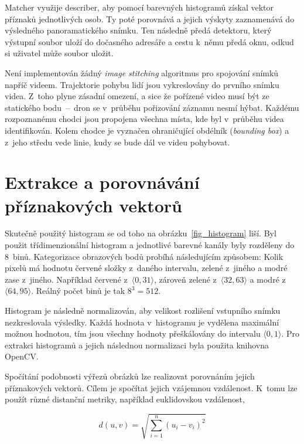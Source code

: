 Matcher využije describer, aby pomocí barevných histogramů získal vektor příznaků jednotlivých osob. Ty poté porovnává a jejich výskyty zaznamenává do výsledného panoramatického snímku. Ten následně předá detektoru, který výstupní soubor uloží do dočasného adresáře a cestu k~němu předá oknu, odkud si uživatel může soubor uložit.

Není implementován žádný \textit{image stitching} algoritmus pro spojování snímků napříč videem. Trajektorie pohybu lidí jsou vykreslovány do prvního snímku videa. Z~toho plyne zásadní omezení, a sice že pořízené video musí být ze statického bodu~--~dron se v~průběhu pořizování záznamu nesmí hýbat. Každému rozpoznanému chodci jsou propojena všechna místa, kde byl v~průběhu videa identifikován. Kolem chodce je vyznačen ohraničující obdélník (\textit{bounding box}) a z~jeho středu vede linie, kudy se bude dál ve videu pohybovat.


\section{Extrakce a porovnávání příznakových vektorů}

Skutečně použitý histogram se od toho na obrázku~\ref{fig_histogram} liší. Byl použit třídimenzionální histogram a jednotlivé barevné kanály byly rozděleny do 8~binů. Kategorizace obrazových bodů probíhá následujícím způsobem: Kolik pixelů má hodnotu červené složky z~daného intervalu, zelené z~jiného a modré zase z~jiného. Například červené z~$\big \langle 0, 31 \big \rangle$, zároveň zelené z~$\big \langle 32, 63 \big \rangle$ a modré z~$\big \langle 64, 95 \big \rangle$. Reálný počet binů je tak $8^3 = 512$.

Histogram je následně normalizován, aby velikost rozlišení vstupního snímku nezkreslovala výsledky. Každá hodnota v~histogramu je vydělena maximální možnou hodnotou, tím jsou všechny hodnoty přeškálovány do intervalu $\big \langle 0, 1 \big \rangle$. Pro extrakci histogramů a jejich následnou normalizaci byla použita knihovna OpenCV.

Spočítání podobnosti výřezů obrázků lze realizovat porovnáním jejich příznakových vektorů. Cílem je spočítat jejich vzájemnou vzdálenost. K~tomu lze použít různé distanční metriky, například euklidovskou vzdálenost,

\begin{equation}
    d(u,v) = \sqrt{\sum_{i=1}^{n} (u_i - v_i)^2}
\end{equation}

